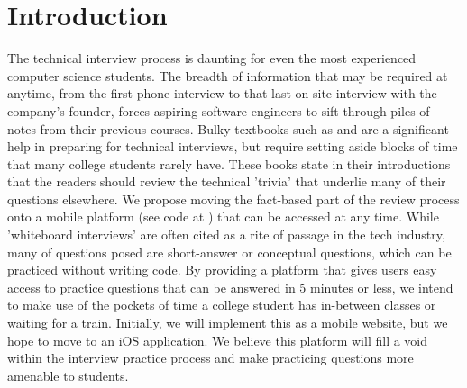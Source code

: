 \section{Introduction}

The technical interview process is daunting for even the most experienced computer science students. The breadth of information that may be required at anytime, from the first phone interview to that last on-site interview with the company's founder, forces aspiring software engineers to sift through piles of notes from their previous courses. Bulky textbooks such as \cite{McDowell} and \cite{EPI} are a significant help in preparing for technical interviews, but require setting aside blocks of time that many college students rarely have. These books state in their introductions that the readers should review the technical 'trivia' that underlie many of their questions elsewhere. We propose moving the fact-based part of the review process onto a mobile platform (see code at \cite{Github}) that can be accessed at any time. While 'whiteboard interviews' are often cited as a rite of passage in the tech industry, many of questions posed are short-answer or conceptual questions, which can be practiced without writing code. By providing a platform that gives users easy access to practice questions that can be answered in 5 minutes or less, we intend to make use of the pockets of time a college student has in-between classes or waiting for a train. Initially, we will implement this as a mobile website, but we hope to move to an iOS application. We believe this platform will fill a void within the interview practice process and make practicing questions more amenable to students. 

